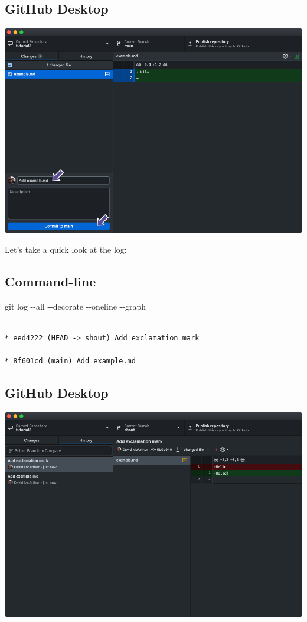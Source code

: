 \documentclass[
  letterpaper,
  DIV=11,
  numbers=noendperiod]{scrartcl}
\newenvironment{Shaded}{\begin{snugshade}}{\end{snugshade}}
\newcommand{\AttributeTok}[1]{\textcolor[rgb]{0.40,0.45,0.13}{#1}}
\newcommand{\FunctionTok}[1]{\textcolor[rgb]{0.28,0.35,0.67}{#1}}
\newcommand{\NormalTok}[1]{\textcolor[rgb]{0.00,0.23,0.31}{#1}}
\begin{document}
\subsection{GitHub Desktop}

\includegraphics{images/image30.png}

Let's take a quick look at the log:

\subsection{Command-line}

\begin{Shaded}
\begin{Highlighting}[]
\FunctionTok{git}\NormalTok{ log }\AttributeTok{{-}{-}all} \AttributeTok{{-}{-}decorate} \AttributeTok{{-}{-}oneline} \AttributeTok{{-}{-}graph}
\end{Highlighting}
\end{Shaded}

\begin{verbatim}

* eed4222 (HEAD -> shout) Add exclamation mark

* 8f601cd (main) Add example.md
\end{verbatim}

\subsection{GitHub Desktop}

\includegraphics{images/image31.png}
\end{document}
